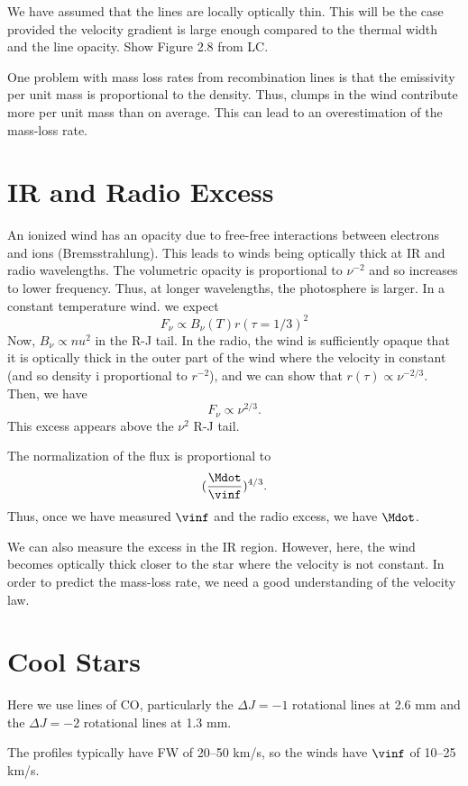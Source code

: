 We have assumed that the lines are locally optically thin. This will be the case provided the velocity gradient is large enough compared to the thermal width and the line opacity. Show Figure 2.8 from LC.

One problem with mass loss rates from recombination lines is that the emissivity per unit mass is proportional to the density. Thus, clumps in the wind contribute more per unit mass than on average. This can lead to an overestimation of the mass-loss rate.

\section{IR and Radio Excess}

An ionized wind has an opacity due to free-free interactions between electrons and ions (Bremsstrahlung). This leads to winds being optically thick at IR and radio wavelengths. The volumetric opacity is proportional to $\nu^{-2}$ and so increases to lower frequency. Thus, at longer wavelengths, the photosphere is larger. In a constant temperature wind. we expect
$$
F_\nu \propto B_\nu(T) r(\tau=1/3)^2
$$
Now, $B_\nu \propto nu^2$ in the R-J tail. In the radio, the wind is sufficiently opaque that it is optically thick in the outer part of the wind where the velocity in constant (and so density i proportional to $r^{-2}$), and we can show that $r(\tau)\propto\nu^{-2/3}$. Then, we have
$$
F_\nu \propto \nu^{2/3}.
$$
This excess appears above the $\nu^2$ R-J tail.

The normalization of the flux is proportional to 
$$
(\frac{\Mdot}{\vinf})^{4/3}.
$$ 
Thus, once we have measured $\vinf$ and the radio excess, we have $\Mdot$.

We can also measure the excess in the IR region. However, here, the wind becomes optically thick closer to the star where the velocity is not constant. In order to predict the mass-loss rate, we need a good understanding of the velocity law.

\section{Cool Stars}

Here we use lines of CO, particularly the $\Delta J = -1$ rotational lines at 2.6 mm and the $\Delta J = -2$ rotational lines at 1.3 mm.

The profiles typically have FW of 20--50 km/s, so the winds have $\vinf$ of 10--25 km/s.

